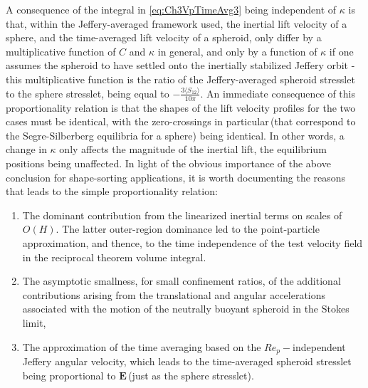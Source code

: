 \documentclass{jfm}
\begin{document}
A consequence of the integral in \eqref{eq:Ch3VpTimeAvg3} being independent of $\kappa$ is that, within the Jeffery-averaged framework used, the inertial lift velocity of a sphere, and the time-averaged lift velocity of a spheroid, only differ by a multiplicative function of $C$ and $\kappa$ in general, and only by a function of $\kappa$ if one assumes the spheroid to have settled onto the inertially stabilized Jeffery orbit 
- this multiplicative function is the ratio of the Jeffery-averaged spheroid stresslet to the sphere stresslet, being equal to $-\frac{3\langle S_{12} \rangle}{10\pi}$. An immediate consequence of this proportionality relation is that the shapes of the lift velocity profiles for the two cases must be identical, with the zero-crossings in particular\,(that correspond to the Segre-Silberberg equilibria for  a sphere) being identical. In other words, a change in $\kappa$ only affects the magnitude of the inertial lift, the equilibrium positions being unaffected. In light of the obvious importance of the above conclusion for shape-sorting applications, it is worth documenting the reasons that leads to the simple proportionality relation:
\begin{enumerate}
	\item The dominant contribution from the linearized inertial terms on scales of $O(H)$. The latter outer-region dominance led to the point-particle approximation, and thence, to the time independence of the test velocity field in the reciprocal theorem volume integral. 
        \item The asymptotic smallness, for small confinement ratios, of the additional contributions arising from the translational and angular accelerations associated with the motion of the neutrally buoyant spheroid in the Stokes limit, 
	\item The approximation of the time averaging based on the $Re_p-$independent Jeffery angular velocity, which leads to the time-averaged spheroid stresslet being proportional to $\bm{E}$\,(just as the sphere stresslet).
\end{enumerate}
\end{document}
